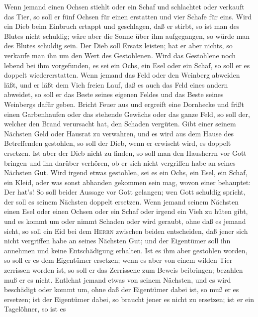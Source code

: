  Wenn jemand einen Ochsen stiehlt oder ein Schaf und
schlachtet oder verkauft das Tier, so soll er fünf Ochsen für einen
erstatten und vier Schafe für eins.  Wird ein Dieb beim
Einbruch ertappt und geschlagen, daß er stirbt, so ist man des Blutes
nicht schuldig;  wäre aber die Sonne über ihm aufgegangen,
so würde man des Blutes schuldig sein. Der Dieb soll Ersatz leisten; hat
er aber nichts, so verkaufe man ihn um den Wert des Gestohlenen.
 Wird das Gestohlene noch lebend bei ihm vorgefunden, es
sei ein Ochs, ein Esel oder ein Schaf, so soll er es doppelt
wiedererstatten.  Wenn jemand das Feld oder den Weinberg
abweiden läßt, und er läßt dem Vieh freien Lauf, daß es auch das Feld
eines andern abweidet, so soll er das Beste seines eigenen Feldes und
das Beste seines Weinbergs dafür geben.  Bricht Feuer aus
und ergreift eine Dornhecke und frißt einen Garbenhaufen oder das
stehende Gewächs oder das ganze Feld, so soll der, welcher den Brand
verursacht hat, den Schaden vergüten.  Gibt einer seinem
Nächsten Geld oder Hausrat zu verwahren, und es wird aus dem Hause des
Betreffenden gestohlen, so soll der Dieb, wenn er erwischt wird, es
doppelt ersetzen.  Ist aber der Dieb nicht zu finden, so
soll man den Hausherrn vor Gott bringen und ihn darüber verhören, ob er
sich nicht vergriffen habe an seines Nächsten Gut.  Wird
irgend etwas gestohlen, sei es ein Ochs, ein Esel, ein Schaf, ein Kleid,
oder was sonst abhanden gekommen sein mag, wovon einer behauptet: Der
hat's! So soll beider Aussage vor Gott gelangen; wen Gott schuldig
spricht, der soll es seinem Nächsten doppelt ersetzen. 
Wenn jemand seinem Nächsten einen Esel oder einen Ochsen oder ein Schaf
oder irgend ein Vieh zu hüten gibt, und es kommt um oder nimmt Schaden
oder wird geraubt, ohne daß es jemand sieht,  so soll ein
Eid bei dem \textsc{Herrn} zwischen beiden entscheiden, daß jener sich
nicht vergriffen habe an seines Nächsten Gut; und der Eigentümer soll
ihn annehmen und keine Entschädigung erhalten.  Ist es
ihm aber gestohlen worden, so soll er es dem Eigentümer ersetzen;
 wenn es aber von einem wilden Tier zerrissen worden ist,
so soll er das Zerrissene zum Beweis beibringen; bezahlen muß er es
nicht.  Entlehnt jemand etwas von seinem Nächsten, und es
wird beschädigt oder kommt um, ohne daß der Eigentümer dabei ist,
 so muß er es ersetzen; ist der Eigentümer dabei, so
braucht jener es nicht zu ersetzen; ist er ein Tagelöhner, so ist es

